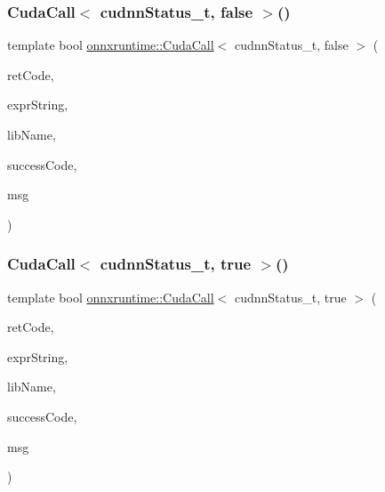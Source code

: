 \subsubsection{\texorpdfstring{Cuda\+Call$<$ cudnn\+Status\+\_\+t, false $>$()}{CudaCall< cudnnStatus\_t, false >()}}
{\footnotesize\ttfamily template bool \mbox{\hyperlink{namespaceonnxruntime_a4bcb94c50ee1b7834c90f0c6334986e0}{onnxruntime\+::\+Cuda\+Call}}$<$ cudnn\+Status\+\_\+t, false $>$ (\begin{DoxyParamCaption}\item[{cudnn\+Status\+\_\+t}]{ret\+Code,  }\item[{const char $\ast$}]{expr\+String,  }\item[{const char $\ast$}]{lib\+Name,  }\item[{cudnn\+Status\+\_\+t}]{success\+Code,  }\item[{const char $\ast$}]{msg }\end{DoxyParamCaption})}

\mbox{\label{namespaceonnxruntime_a5381d1d884b2d527d1d9542d612d8e60}} 
\subsubsection{\texorpdfstring{Cuda\+Call$<$ cudnn\+Status\+\_\+t, true $>$()}{CudaCall< cudnnStatus\_t, true >()}}
{\footnotesize\ttfamily template bool \mbox{\hyperlink{namespaceonnxruntime_a4bcb94c50ee1b7834c90f0c6334986e0}{onnxruntime\+::\+Cuda\+Call}}$<$ cudnn\+Status\+\_\+t, true $>$ (\begin{DoxyParamCaption}\item[{cudnn\+Status\+\_\+t}]{ret\+Code,  }\item[{const char $\ast$}]{expr\+String,  }\item[{const char $\ast$}]{lib\+Name,  }\item[{cudnn\+Status\+\_\+t}]{success\+Code,  }\item[{const char $\ast$}]{msg }\end{DoxyParamCaption})}

\mbox{\label{namespaceonnxruntime_ae6993f12dfe6ecc41eec5de1f6ae065c}} 
